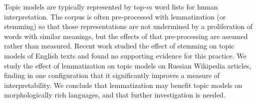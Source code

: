 Topic models are typically represented by top-$m$ word lists for human interpretation.  The corpus is often pre-processed with lemmatization (or stemming) so that those representations are not undermined by a proliferation of words with similar meanings, but the effects of that pre-processing are assumed rather than measured.  Recent work studied the effect of stemming on topic models of English texts and found no supporting evidence for this practice.  We study the effect of lemmatization on topic models on Russian Wikipedia articles, finding in one configuration that it significantly improves a measure of interpretability.  We conclude that lemmatization may benefit topic models on morphologically rich languages, and that further investigation is needed.
